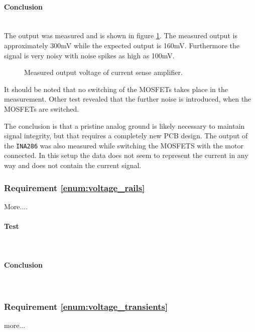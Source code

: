\paragraph{Conclusion}~\\
The output was measured and is shown in figure \ref{fig:controllerboardv2_current_sense}.
The measured output is approximately 300mV while the expected output is 160mV.
Furthermore the signal is very noisy with noise spikes as high as 100mV. 

\begin{figure}[h]
\centering

\caption{Measured output voltage of current sense amplifier.}
\label{fig:controllerboardv2_current_sense}
\end{figure}

It should be noted that no switching of the MOSFETs takes place in the measurement.
Other test revealed that the further noise is introduced, when the MOSFETs are switched.

The conclusion is that a pristine analog ground is likely necessary to maintain signal integrity, but that requires a completely new PCB design. 
The output of the \texttt{INA286} was also measured while switching the MOSFETS with the motor connected.
In this setup the data does not seem to represent the current in any way and does not contain the current signal. 



\subsubsection{Requirement \ref{enum:voltage_rails}} %
\label{ssub:requirement_enum:voltage_rails}
More....

\paragraph{Test}~\\

\paragraph{Conclusion}~\\


\subsubsection{Requirement \ref{enum:voltage_transients}} %
\label{ssub:requirement_enum:voltage_transients}
more...

